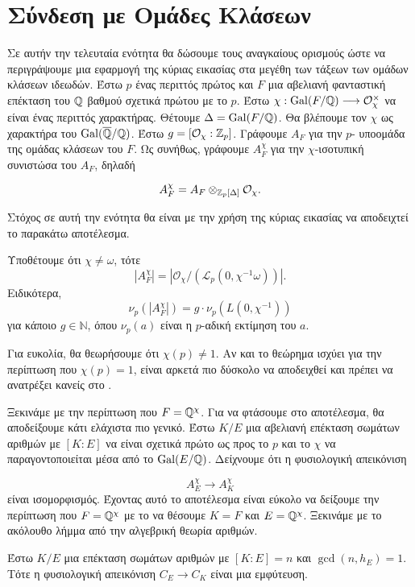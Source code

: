 \section{Σύνδεση με Ομάδες Κλάσεων}


Σε αυτήν την τελευταία ενότητα θα δώσουμε τους αναγκαίους ορισμούς ώστε να περιγράψουμε μια εφαρμογή της κύριας εικασίας στα μεγέθη των τάξεων των ομάδων κλάσεων ιδεωδών. Έστω $p$ ένας περιττός πρώτος και $F$ μια αβελιανή φανταστική επέκταση του $\mathbb{Q}$ βαθμού σχετικά πρώτου με το $p$. Έστω $\chi: \operatorname{Gal}(F/\mathbb{Q})\longrightarrow \mathcal{O}_\chi^\times$ να είναι ένας περιττός χαρακτήρας. Θέτουμε $\Delta = \operatorname{Gal}(F/\mathbb{Q})$. Θα βλέπουμε τον $\chi$ ως χαρακτήρα του $\operatorname{Gal}(\overline{\mathbb{Q}}/\mathbb{Q})$. Έστω $g= [\mathcal{O}_\chi : \mathbb{Z}_p]$. Γράφουμε $A_F$ για την $p$- 
υποομάδα της ομάδας κλάσεων του $F$. Ως συνήθως, γράφουμε $A^\chi_F$ για την $\chi$-ισοτυπική συνιστώσα του $A_F$, δηλαδή

$$A^\chi_F = A_F \otimes_{\mathbb{Z}_p[\Delta]} \mathcal{O}_\chi.$$

\noindent Στόχος σε αυτή την ενότητα θα είναι με την χρήση της κύριας εικασίας να αποδειχτεί το παρακάτω αποτέλεσμα.

\begin{theorem}
    Υποθέτουμε ότι $\chi \neq \omega$, τότε 
    $$|A^\chi_F| = |\mathcal{O}_\chi / (\mathcal{L}_p(0,\chi^{-1}\omega))|.$$ Ειδικότερα,
    $$\nu_p(|A^\chi_F|) = g \cdot \nu_p (L(0,\chi^{-1}))$$ για κάποιο $g \in \mathbb{N}$, όπου $\nu_p(a)$ είναι η $p$-αδική εκτίμηση του $a$.
\end{theorem}

\noindent Για ευκολία, θα θεωρήσουμε ότι $\chi(p)\neq 1$. Αν και το θεώρημα ισχύει για την περίπτωση που $\chi(p)=1$, 
είναι αρκετά πιο δύσκολο να αποδειχθεί και πρέπει να ανατρέξει κανείς στο \cite{MW}.

Ξεκινάμε με την περίπτωση που $F = \mathbb{Q}^\chi$. Για να φτάσουμε στο αποτέλεσμα, θα αποδείξουμε κάτι ελάχιστα πιο γενικό. Έστω $K/E$ μια αβελιανή επέκταση σωμάτων αριθμών με $[K:E]$ να είναι σχετικά πρώτο ως προς το $p$ και το $\chi$ να παραγοντοποιείται μέσα από το $\operatorname{Gal}(E/\mathbb{Q})$. Δείχνουμε ότι η φυσιολογική απεικόνιση

$$A^\chi_E \longrightarrow A^\chi_K$$ είναι ισομορφισμός. Έχοντας αυτό το αποτέλεσμα είναι εύκολο να δείξουμε την περίπτωση που $F=\mathbb{Q}^\chi$ με το να θέσουμε $K=F$ και $E=\mathbb{Q}^\chi$. Ξεκινάμε με το ακόλουθο λήμμα από την αλγεβρική θεωρία αριθμών.

\begin{lemma}
    Έστω $K/E$ μια  επέκταση σωμάτων αριθμών με $[K:E] = n$ και $\gcd(n,h_E) = 1$. Τότε η φυσιολογική απεικόνιση $C_E \longrightarrow C_K$ είναι μια εμφύτευση.
\end{lemma}

